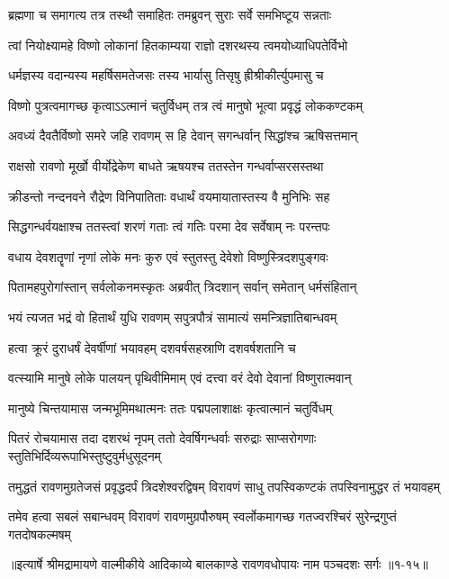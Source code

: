 \twolineshloka
{ब्रह्मणा च समागत्य तत्र तस्थौ समाहितः}
{तमब्रुवन् सुराः सर्वे समभिष्टूय सन्नताः} %

\twolineshloka
{त्वां नियोक्ष्यामहे विष्णो लोकानां हितकाम्यया}
{राज्ञो दशरथस्य त्वमयोध्याधिपतेर्विभो} %

\twolineshloka
{धर्मज्ञस्य वदान्यस्य महर्षिसमतेजसः}
{तस्य भार्यासु तिसृषु ह्रीश्रीकीर्त्युपमासु च} %

\twolineshloka
{विष्णो पुत्रत्वमागच्छ कृत्वाऽऽत्मानं चतुर्विधम्}
{तत्र त्वं मानुषो भूत्वा प्रवृद्धं लोककण्टकम्} %

\twolineshloka
{अवध्यं दैवतैर्विष्णो समरे जहि रावणम्}
{स हि देवान् सगन्धर्वान् सिद्धांश्च ऋषिसत्तमान्} %

\twolineshloka
{राक्षसो रावणो मूर्खो वीर्योद्रेकेण बाधते}
{ऋषयश्च ततस्तेन गन्धर्वाप्सरसस्तथा} %

\twolineshloka
{क्रीडन्तो नन्दनवने रौद्रेण विनिपातिताः}
{वधार्थं वयमायातास्तस्य वै मुनिभिः सह} %

\twolineshloka
{सिद्धगन्धर्वयक्षाश्च ततस्त्वां शरणं गताः}
{त्वं गतिः परमा देव सर्वेषाम् नः परन्तपः} %

\twolineshloka
{वधाय देवशतॄणां नृणां लोके मनः कुरु}
{एवं स्तुतस्तु देवेशो विष्णुस्त्रिदशपुङ्गवः} %

\twolineshloka
{पितामहपुरोगांस्तान् सर्वलोकनमस्कृतः}
{अब्रवीत् त्रिदशान् सर्वान् समेतान् धर्मसंहितान्} %

\twolineshloka
{भयं त्यजत भद्रं वो हितार्थं युधि रावणम्}
{सपुत्रपौत्रं सामात्यं समन्त्रिज्ञातिबान्धवम्} %

\twolineshloka
{हत्वा क्रूरं दुराधर्षं देवर्षीणां भयावहम्}
{दशवर्षसहस्राणि दशवर्षशतानि च} %

\twolineshloka
{वत्स्यामि मानुषे लोके पालयन् पृथिवीमिमाम्}
{एवं दत्त्वा वरं देवो देवानां विष्णुरात्मवान्} %

\twolineshloka
{मानुष्ये चिन्तयामास जन्मभूमिमथात्मनः}
{ततः पद्मपलाशाक्षः कृत्वात्मानं चतुर्विधम्} %

\threelineshloka
{पितरं रोचयामास तदा दशरथं नृपम्}
{ततो देवर्षिगन्धर्वाः सरुद्राः साप्सरोगणाः}
{स्तुतिभिर्दिव्यरूपाभिस्तुष्टुवुर्मधुसूदनम्} %

\twolineshloka
{तमुद्धतं रावणमुग्रतेजसं प्रवृद्धदर्पं त्रिदशेश्वरद्विषम्}
{विरावणं साधु तपस्विकण्टकं तपस्विनामुद्धर तं भयावहम्} %

\twolineshloka
{तमेव हत्वा सबलं सबान्धवम् विरावणं रावणमुग्रपौरुषम्}
{स्वर्लोकमागच्छ गतज्वरश्चिरं सुरेन्द्रगुप्तं गतदोषकल्मषम्} %


॥इत्यार्षे श्रीमद्रामायणे वाल्मीकीये आदिकाव्ये बालकाण्डे रावणवधोपायः नाम पञ्चदशः सर्गः ॥१-१५॥
